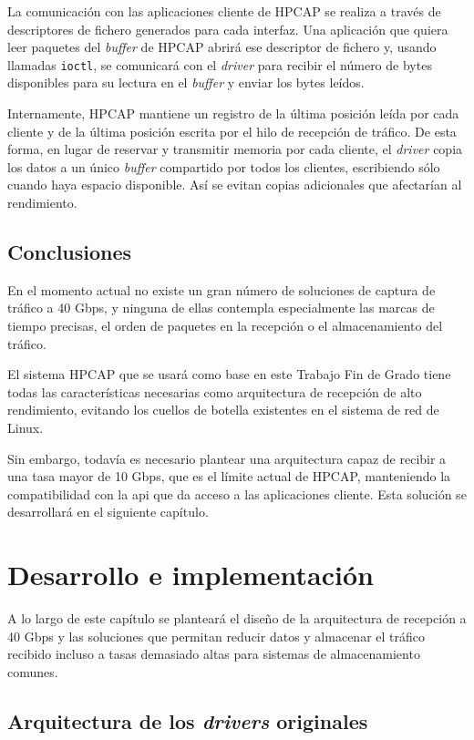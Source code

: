 \documentclass[twoside, 12pt, draft]{epstfg}
\begin{document}
La comunicación con las aplicaciones cliente de HPCAP se realiza a través de descriptores de fichero generados para cada interfaz. Una aplicación que quiera leer paquetes del \textit{buffer} de HPCAP abrirá ese descriptor de fichero y, usando llamadas \texttt{ioctl}, se comunicará con el \textit{driver} para recibir el número de bytes disponibles para su lectura en el \textit{buffer} y enviar los bytes leídos.

Internamente, HPCAP mantiene un registro de la última posición leída por cada cliente y de la última posición escrita por el hilo de recepción de tráfico. De esta forma, en lugar de reservar y transmitir memoria por cada cliente, el \textit{driver} copia los datos a un único \textit{buffer} compartido por todos los clientes, escribiendo sólo cuando haya espacio disponible. Así se evitan copias adicionales que afectarían al rendimiento.

\section{Conclusiones}

En el momento actual no existe un gran número de soluciones de captura de tráfico a 40 Gbps, y ninguna de ellas contempla especialmente las marcas de tiempo precisas, el orden de paquetes en la recepción o el almacenamiento del tráfico.

El sistema HPCAP que se usará como base en este Trabajo Fin de Grado tiene todas las características necesarias como arquitectura de recepción de alto rendimiento, evitando los cuellos de botella existentes en el sistema de red de Linux.

Sin embargo, todavía es necesario plantear una arquitectura capaz de recibir a una tasa mayor de 10 Gbps, que es el límite actual de HPCAP, manteniendo la compatibilidad con la \gls{api} que da acceso a las aplicaciones cliente. Esta solución se desarrollará en el siguiente capítulo.

\chapter{Desarrollo e implementación}
\label{chap:Desarrollo}

A lo largo de este capítulo se planteará el diseño de la arquitectura de recepción a 40 Gbps y las soluciones que permitan reducir datos y almacenar el tráfico recibido incluso a tasas demasiado altas para sistemas de almacenamiento comunes.

\section{Arquitectura de los \textit{drivers} originales}
\label{sec:ArquitecturaOriginal}
\end{document}
